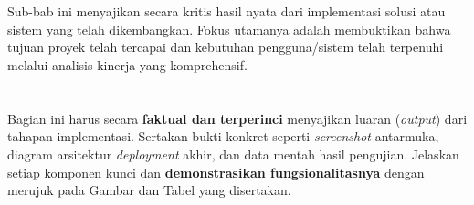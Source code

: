 \documentclass{elsinta}
\begin{document}
\coverpage
\newpage


\newpage


\clearpage
{}
\setcounter{page}{1} 
\pagestyle{myfooter} %


\tableofcontents
\newpage
\section*{\docsumary}
Sub-bab ini menyajikan secara kritis hasil nyata dari implementasi solusi atau sistem yang telah dikembangkan. Fokus utamanya adalah membuktikan bahwa tujuan proyek telah tercapai dan kebutuhan pengguna/sistem telah terpenuhi melalui analisis kinerja yang komprehensif.

\newpage
\label{sec:impl_result_analysis}



\section{}

    Bagian ini harus secara \textbf{faktual dan terperinci} menyajikan luaran (\textit{output}) dari tahapan implementasi. Sertakan bukti konkret seperti \textit{screenshot} antarmuka, diagram arsitektur \textit{deployment} akhir, dan data mentah hasil pengujian.
    Jelaskan setiap komponen kunci dan \textbf{demonstrasikan fungsionalitasnya} dengan merujuk pada Gambar dan Tabel yang 
    disertakan.
  

\subsection{\ImplementationProceduresTitle}
\end{document}
